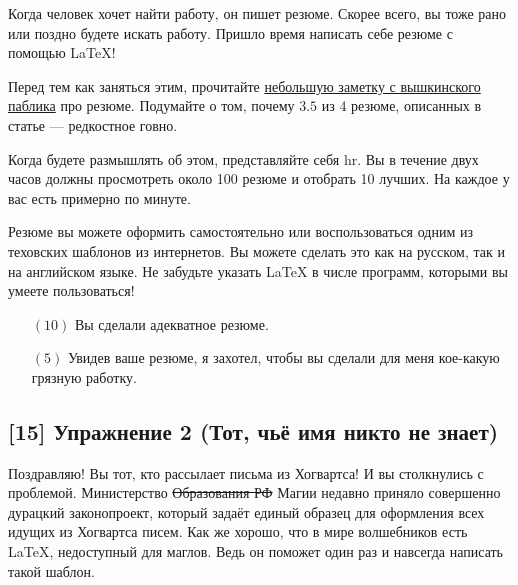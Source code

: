 \documentclass[12pt, a4paper, oneside]{article}
\begin{document}
Когда человек хочет найти работу, он пишет резюме. Скорее всего, вы тоже рано или поздно будете искать работу.  Пришло время написать себе резюме с помощью \LaTeX{}!

Перед тем как заняться этим, прочитайте \href{https://vk.com/@thevyshka-kak-luchshe-oformit-rezume-kommentarii-hr-specialista}{небольшую заметку с вышкинского паблика} про резюме. Подумайте о том, почему $3.5$ из $4$ резюме, описанных в статье --- редкостное говно. 

Когда будете размышлять об этом, представляйте себя hr. Вы в течение  двух часов должны просмотреть около 100 резюме и отобрать 10 лучших. На каждое у вас есть примерно по минуте. 

Резюме вы можете оформить самостоятельно или воспользоваться одним из теховских шаблонов из интернетов. Вы можете сделать это как на русском, так и на английском языке. Не забудьте указать  \LaTeX{} в числе программ, которыми вы умеете пользоваться!  

\begin{itemize}
	\item[$(10)$] Вы сделали адекватное резюме.
	\item[$(5)$] Увидев ваше резюме, я захотел, чтобы вы сделали для меня кое-какую грязную работку.
\end{itemize}


\subsection*{[15]   Упражнение 2 (Тот, чьё имя никто не знает)}

Поздравляю! Вы тот, кто рассылает письма из Хогвартса! И вы столкнулись с проблемой. Министерство \sout{Образования РФ}  Магии недавно приняло совершенно дурацкий законопроект, который задаёт единый образец для оформления всех идущих из Хогвартса писем. Как же хорошо, что в мире волшебников есть \LaTeX{}, недоступный для маглов. Ведь он поможет один раз и навсегда написать такой шаблон. 
\end{document}
